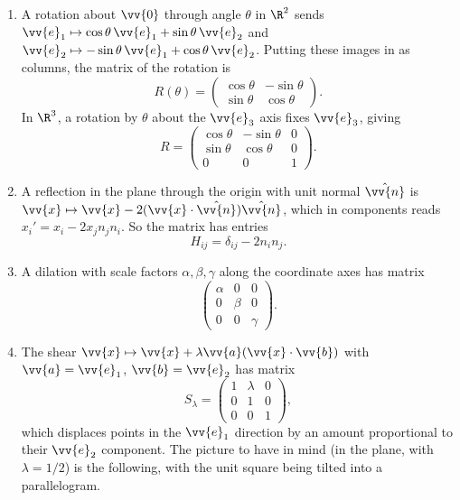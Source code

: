 \begin{example}
	\begin{enumerate}[label=(\roman*)]
		\item A rotation about $\vv{0}$ through angle $\theta$ in $\R^2$ sends $\vv{e}_1 \mapsto \cos \theta \, \vv{e}_1 + \sin \theta\, \vv{e}_2$ and $\vv{e}_2 \mapsto -\sin \theta \,\vv{e}_1 + \cos \theta\, \vv{e}_2$. Putting these images in as columns, the matrix of the rotation is
		$$
		R(\theta) = \begin{pmatrix}
			\cos \theta & - \sin \theta \\
			\sin \theta & \cos \theta
		\end{pmatrix}.
		$$
		In $\R^3$, a rotation by $\theta$ about the $\vv{e}_3$ axis fixes $\vv{e}_3$, giving
		$$
		R = \begin{pmatrix}
			\cos \theta & - \sin \theta & 0\\
			\sin \theta & \cos \theta & 0 \\
			0 & 0 & 1
		\end{pmatrix}.
		$$
		\item A reflection in the plane through the origin with unit normal $\hat{\vv{n}}$ is $\vv{x} \mapsto \vv{x} - 2 (\vv{x} \cdot \hat{\vv{n}}) \hat{\vv{n}}$, which in components reads $x_i' = x_i - 2 x_j n_j n_i$. So the matrix has entries
		$$
		H_{ij} = \delta_{ij} - 2 n_i n_j.
		$$
		\item A dilation with scale factors $\alpha, \beta, \gamma$ along the coordinate axes has matrix
		$$
		\begin{pmatrix}
			\alpha & 0 & 0 \\
			0 & \beta & 0 \\
			0 & 0 & \gamma
		\end{pmatrix}.
		$$
		\item The shear $\vv{x} \mapsto \vv{x} + \lambda \vv{a}(\vv{x} \cdot \vv{b})$ with $\vv{a} = \vv{e}_1$, $\vv{b} = \vv{e}_2$ has matrix
		$$
		S_\lambda = \begin{pmatrix}
			1 & \lambda & 0 \\
			0 & 1 & 0 \\
			0 & 0 & 1
		\end{pmatrix},
		$$
		which displaces points in the $\vv{e}_1$ direction by an amount proportional to their $\vv{e}_2$ component. The picture to have in mind (in the plane, with $\lambda = 1/2$) is the following, with the unit square being tilted into a parallelogram.


\end{enumerate}
\end{example}
